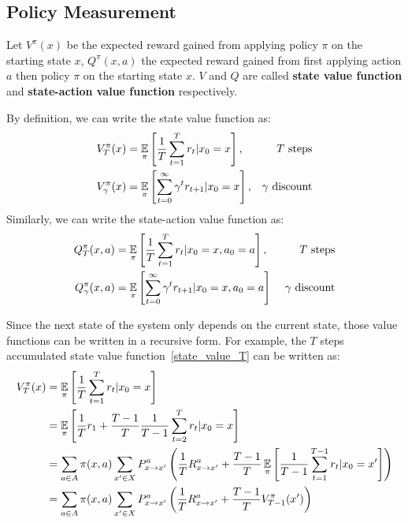 \subsection{Policy Measurement}
Let $V^\pi(x)$ be the expected reward gained from applying policy $\pi$ on the starting state $x$, 
$Q^\pi(x, a)$ the expected reward gained from first applying action $a$ then policy $\pi$ on the starting
state $x$. $V$ and $Q$ are called \textbf{state value function} and \textbf{state-action value function}
respectively. \par
By definition, we can write the state value function as:
\begin{align}
    V^\pi_T(x) &= \operatorname*{\mathbb{E}}_\pi\left[\frac{1}{T}\sum_{t=1}^{T}r_t | x_0 = x\right], &\text{$T$ steps}
    \label{state_value_T}\\
    V^\pi_\gamma(x) &= \operatorname*{\mathbb{E}}_\pi\left[\sum_{t=0}^{\infty} \gamma^t r_{t+1} | x_0 = x\right], &\text{$\gamma$ 
    discount}\label{state_value_gamma}
\end{align}
Similarly, we can write the state-action value function as:
\begin{align}
    Q^\pi_T(x, a) &= \operatorname*{\mathbb{E}}_\pi\left[\frac{1}{T}\sum_{t=1}^T r_t | x_0 = x, a_0 = a\right], &\text{$T$ steps}
    \label{state-action_value_T}\\
    Q^\pi_\gamma(x, a) &= \operatorname*{\mathbb{E}}_\pi\left[\sum_{t=0}^\infty \gamma^t r_{t+1} | x_0 = x, a_0 = a\right] &\text{
    $\gamma$ discount}\label{state-action_value_gamma}
\end{align}
\par
Since the next state of the system only depends on the current state, those value functions can be written in
a recursive form. For example, the $T$ steps accumulated state value function~\eqref{state_value_T} can be 
written as:
\begin{align}
    V^\pi_T(x) &= \operatorname*{\mathbb{E}}_\pi \left[\frac{1}{T}\sum_{t=1}^T r_t | x_0 = x\right]\nonumber\\
               &= \operatorname*{\mathbb{E}}_\pi \left[\frac{1}{T} r_1 + \frac{T-1}{T}\frac{1}{T-1}\sum_{t=2}^T r_t | x_0 = x\right]
               \nonumber\\
               &= \sum_{a\in A}\pi(x, a)\sum_{x'\in X}P_{x\rightarrow x'}^a\left(\frac{1}{T}
               R_{x\rightarrow x'}^a + \frac{T-1}{T}\operatorname*{\mathbb{E}}_\pi\left[\frac{1}{T-1}\sum_{t=1}^{T-1}r_t | x_0=x'
               \right]\right)\nonumber\\
               &= \sum_{a\in A}\pi(x, a)\sum_{x'\in X}P_{x\rightarrow x'}^a\left(\frac{1}{T}
               R_{x\rightarrow x'}^a + \frac{T-1}{T} V^\pi_{T-1}(x')\right)\label{state_value_T_expansion}
\end{align}

